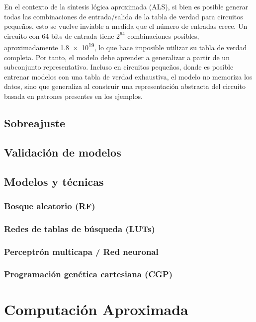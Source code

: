 En el contexto de la síntesis lógica aproximada (ALS), si bien es posible
generar todas las combinaciones de entrada/salida de la tabla de verdad para
circuitos pequeños, esto se vuelve inviable a medida que el número de entradas
crece. Un circuito con 64 bits de entrada tiene $2^{64}$ combinaciones
posibles, aproximadamente \num{1.8e19}, lo que hace imposible utilizar su tabla
de verdad completa. Por tanto, el modelo debe aprender a generalizar a partir
de un subconjunto representativo. Incluso en circuitos pequeños, donde es
posible entrenar modelos con una tabla de verdad exhaustiva, el modelo no
memoriza los datos, sino que generaliza al construir una representación
abstracta del circuito basada en patrones presentes en los ejemplos.

\subsection{Sobreajuste}

\subsection{Validación de modelos}

\subsection{Modelos y técnicas}

\subsubsection{Bosque aleatorio (RF)}

\subsubsection{Redes de tablas de búsqueda (LUTs)}

\subsubsection{Perceptrón multicapa / Red neuronal}

\subsubsection{Programación genética cartesiana (CGP)}

\section{Computación Aproximada}

